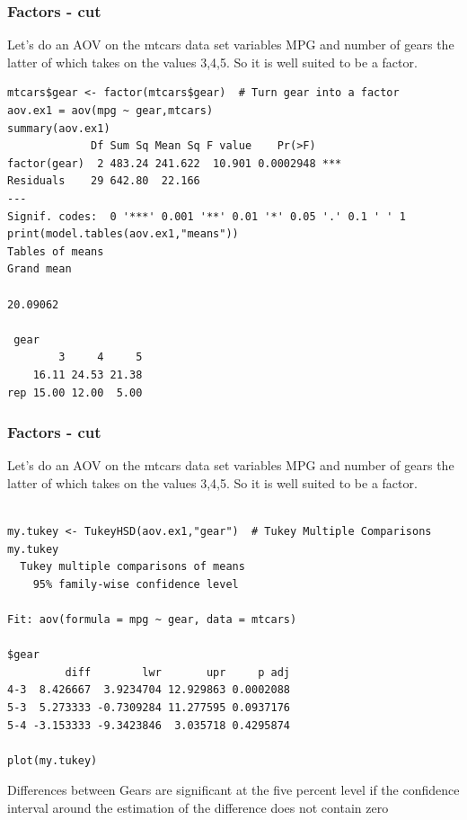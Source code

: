 \documentclass{beamer}
\begin{document}
\begin{frame}[fragile]
\frametitle{Factors - cut}
Let's do an AOV on the mtcars data set variables MPG and number of gears the latter of which takes on the values 3,4,5. So it is well suited to be a factor.
\scriptsize
\begin{verbatim}
mtcars$gear <- factor(mtcars$gear)  # Turn gear into a factor
aov.ex1 = aov(mpg ~ gear,mtcars)
summary(aov.ex1)
             Df Sum Sq Mean Sq F value    Pr(>F)    
factor(gear)  2 483.24 241.622  10.901 0.0002948 ***
Residuals    29 642.80  22.166                      
---
Signif. codes:  0 '***' 0.001 '**' 0.01 '*' 0.05 '.' 0.1 ' ' 1 
print(model.tables(aov.ex1,"means"))
Tables of means
Grand mean
         
20.09062 

 gear 
        3     4     5
    16.11 24.53 21.38
rep 15.00 12.00  5.00

\end{verbatim}
\scriptsize
\end{frame}

\begin{frame}[fragile]
\frametitle{Factors - cut}
Let's do an AOV on the mtcars data set variables MPG and number of gears the latter of which takes on the values 3,4,5. So it is well suited to be a factor.
\scriptsize
\begin{verbatim}
 
my.tukey <- TukeyHSD(aov.ex1,"gear")  # Tukey Multiple Comparisons
my.tukey
  Tukey multiple comparisons of means
    95% family-wise confidence level

Fit: aov(formula = mpg ~ gear, data = mtcars)

$gear
         diff        lwr       upr     p adj
4-3  8.426667  3.9234704 12.929863 0.0002088
5-3  5.273333 -0.7309284 11.277595 0.0937176
5-4 -3.153333 -9.3423846  3.035718 0.4295874

plot(my.tukey)
\end{verbatim}
\normalsize
Differences between Gears are significant at the five percent level if the confidence interval around 
the estimation of the difference does not contain zero
\scriptsize
\end{frame}

%
\end{document}

